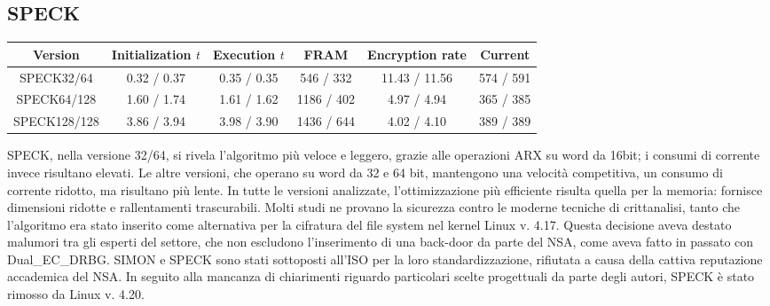 \documentclass[target=bach,aauheader=,style=]{thud}
\begin{document}
		\subsection{SPECK}
		\begin{center}
			\begin{tabular}{|c| *{5}{c|}}
				\hline
				\textbf{Version} & \textbf{Initialization} $t$& \textbf{Execution} $t$ & \textbf{FRAM} & \textbf{Encryption rate} & \textbf{Current} \\
				\hline
				SPECK32/64 & \textcolor{Mahogany}{0.32} / \textcolor{OliveGreen}{0.37} & \textcolor{Mahogany}{0.35} / \textcolor{OliveGreen}{0.35} & \textcolor{Mahogany}{546} / \textcolor{OliveGreen}{332} & \textcolor{Mahogany}{11.43} / \textcolor{OliveGreen}{11.56} & \textcolor{Mahogany}{574} / \textcolor{OliveGreen}{591} \\
				\hline
				SPECK64/128 & \textcolor{Mahogany}{1.60} / \textcolor{OliveGreen}{1.74} & \textcolor{Mahogany}{1.61} / \textcolor{OliveGreen}{1.62} & \textcolor{Mahogany}{1186} / \textcolor{OliveGreen}{402} & \textcolor{Mahogany}{4.97} / \textcolor{OliveGreen}{4.94} & \textcolor{Mahogany}{365} / \textcolor{OliveGreen}{385} \\
				\hline
				SPECK128/128 & \textcolor{Mahogany}{3.86} / \textcolor{OliveGreen}{3.94} & \textcolor{Mahogany}{3.98} / \textcolor{OliveGreen}{3.90} & \textcolor{Mahogany}{1436} / \textcolor{OliveGreen}{644} & \textcolor{Mahogany}{4.02} / \textcolor{OliveGreen}{4.10} & \textcolor{Mahogany}{389} / \textcolor{OliveGreen}{389} \\
				\hline
			\end{tabular}
		\end{center}
		
		SPECK, nella versione 32/64, si rivela l'algoritmo più veloce e leggero, grazie alle operazioni ARX su word da 16bit; i consumi di corrente invece risultano elevati. Le altre versioni, che operano su word da 32 e 64 bit, mantengono una velocità competitiva, un consumo di corrente ridotto, ma risultano più lente. In tutte le versioni analizzate, l'ottimizzazione più efficiente risulta quella per la memoria: fornisce dimensioni ridotte e rallentamenti trascurabili. Molti studi ne provano la sicurezza contro le moderne tecniche di crittanalisi, tanto che l'algoritmo era stato inserito come alternativa per la cifratura del file system nel kernel Linux v. 4.17. Questa decisione aveva destato malumori tra gli esperti del settore, che non escludono l'inserimento di una back-door da parte del NSA, come aveva fatto in passato con Dual\_EC\_DRBG. SIMON e SPECK sono stati sottoposti all'ISO per la loro standardizzazione, rifiutata a causa della cattiva reputazione accademica del NSA. In seguito alla mancanza di chiarimenti riguardo particolari scelte progettuali da parte degli autori, SPECK è stato rimosso da Linux v. 4.20. 
\end{document}
